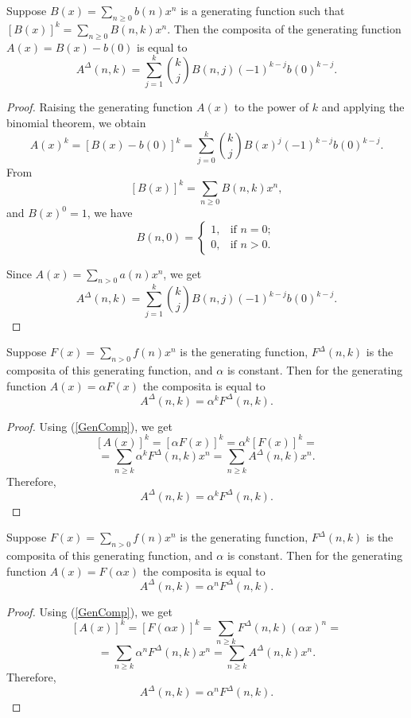 \documentclass[12pt]{article}
\begin{document}
\begin{theorem}
\label{comp-b}
Suppose $B(x)=\sum_{n\geq 0} b(n)x^n$ is a generating function  such that $[B(x)]^k=\sum_{n\geq 0}B(n,k)x^n$. Then the composita of the generating function $A(x)=B(x)-b(0)$ is equal to
\begin{equation}
A^{\Delta}(n,k)=\sum_{j=1}^k {k \choose j}B(n,j)(-1)^{k-j}b(0)^{k-j}.
\end{equation}
\end{theorem}

\begin{proof} Raising the generating function $A(x)$ to the power of $k$ and applying the binomial theorem, we obtain 
$$
A(x)^k=\left[B(x)-b(0)\right]^k=\sum_{j=0}^k {k \choose j}B(x)^j(-1)^{k-j}b(0)^{k-j}.
$$
From 
$$
[B(x)]^k=\sum_{n\geq 0}B(n,k)x^n,
$$
and
$B(x)^0=1$, we have
$$
B(n,0)=\begin{cases}
1, & \text{if $n=0$};\\
0, & \text{if $n>0$}.
\end{cases}
$$

Since $A(x)=\sum_{n>0} a(n)x^n$, we get
$$
A^{\Delta}(n,k)=\sum_{j=1}^k {k \choose j}B(n,j)(-1)^{k-j}b(0)^{k-j}.
$$
\end{proof}




\begin{theorem}
\label{Theorem_ak}
 Suppose $F(x)=\sum_{n>0} f(n)x^n$ is the generating function, $F^{\Delta}(n,k)$ is the composita of this generating function, and $\alpha$ is constant. Then for the generating function $A(x)=\alpha F(x)$  the composita is equal to 
\begin{equation}
A^{\Delta}(n,k)=\alpha^k F^{\Delta}(n,k).
\end{equation}
\end{theorem}
\begin{proof}
Using (\ref{GenComp}), we get
$$
[A(x)]^k=[\alpha F(x)]^k=\alpha^k[F(x)]^k=
$$
$$
=\sum_{n\geq  k} \alpha^k F^{\Delta}(n,k)x^n=\sum_{n\geq  k} A^{\Delta}(n,k)x^n.
$$
Therefore,
$$
A^{\Delta}(n,k)=\alpha^k F^{\Delta}(n,k).
$$
\end{proof}

\begin{theorem} \label{Theorem_an} 
Suppose $F(x)=\sum_{n>0} f(n)x^n$ is the generating function, $F^{\Delta}(n,k)$ is the composita of this generating function, and $\alpha$ is constant. Then for the generating function $A(x)=F(\alpha x)$ the composita is equal to
\begin{equation}
A^{\Delta}(n,k)=\alpha^n F^{\Delta}(n,k).
\end{equation}
\end{theorem}
\begin{proof}
Using (\ref{GenComp}), we get
$$
[A(x)]^k=[F(\alpha x)]^k=\sum_{n\geq  k} F^{\Delta}(n,k)(\alpha x)^n=
$$
$$
=\sum_{n\geq  k} \alpha^n F^{\Delta}(n,k)x^n=\sum_{n\geq  k} A^{\Delta}(n,k)x^n.
$$
Therefore,
$$
A^{\Delta}(n,k)=\alpha^n F^{\Delta}(n,k).
$$
\end{proof}
\end{document}
